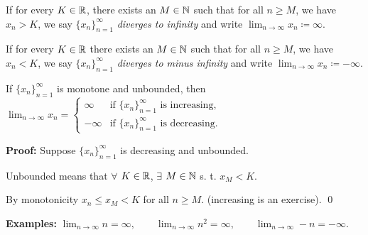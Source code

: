 \documentclass[10pt,aspectratio=149]{beamer}
\begin{document}
\begin{frame}

\begin{definition}
If for every $K \in {\mathbb{R}}$, there exists an $M \in {\mathbb{N}}$ such that
for all $n \geq M$, we have $x_n > K$,
we say $\{ x_n \}_{n=1}^\infty$ \emph{diverges to infinity} and write
\quad
$\displaystyle \lim_{n \to \infty} x_n \coloneqq \infty$.

\pause
\medskip

If for every $K \in {\mathbb{R}}$ there exists an $M \in {\mathbb{N}}$ such that
for all $n \geq M$, we have $x_n < K$,
we say $\{ x_n \}_{n=1}^\infty$ \emph{diverges to minus infinity} and write
\quad
$\displaystyle \lim_{n \to \infty} x_n \coloneqq -\infty$.
\end{definition}


\pause

\begin{proposition}
If $\{ x_n \}_{n=1}^\infty$ is monotone and unbounded, then
$\displaystyle
\lim_{n \to \infty} x_n =
\begin{cases}
\infty  & \text{if } \{ x_n \}_{n=1}^\infty \text{ is increasing,} \\
-\infty & \text{if } \{ x_n \}_{n=1}^\infty \text{ is decreasing.}
\end{cases}
$
\end{proposition}

\pause
\textbf{Proof:}
Suppose $\{x_n\}_{n=1}^\infty$ is decreasing and unbounded.

\pause
Unbounded means that $\forall$ $K \in {\mathbb{R}}$, $\exists$ $M \in {\mathbb{N}}$ s. t. $x_M < K$.

\pause
By monotonicity $x_n \leq x_M < K$ for all $n \geq M$.
\pause \quad (increasing is an exercise).
\qed

\pause
\medskip

\textbf{Examples:}
$\displaystyle \lim_{n\to \infty} n = \infty,
\qquad
\lim_{n\to \infty} n^2 = \infty,
\qquad
\lim_{n\to \infty} -n = -\infty$.
\end{frame}
\end{document}
